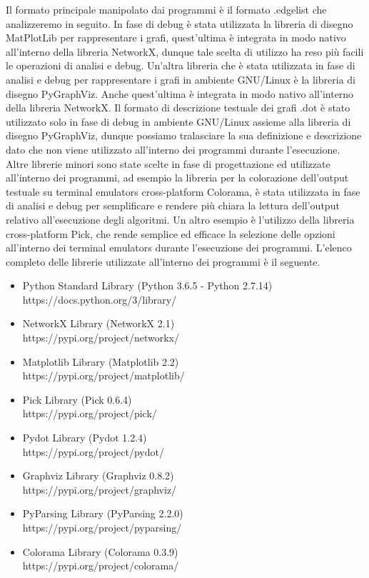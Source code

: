 Il formato principale manipolato dai programmi è il formato .edgelist che analizzeremo in seguito. In fase di debug è stata utilizzata la libreria di disegno MatPlotLib per rappresentare i grafi, quest'ultima è integrata in modo nativo all'interno della libreria NetworkX, dunque tale scelta di utilizzo ha reso più facili le operazioni di analisi e debug. Un'altra libreria che è stata utilizzata in fase di analisi e debug per rappresentare i grafi in ambiente GNU/Linux è la libreria di disegno PyGraphViz. Anche quest'ultima è integrata in modo nativo all'interno della libreria NetworkX. Il formato di descrizione testuale dei grafi .dot è stato utilizzato solo in fase di debug in ambiente GNU/Linux assieme alla libreria di disegno PyGraphViz, dunque possiamo tralasciare la sua definizione e descrizione dato che non viene utilizzato all'interno dei programmi durante l'esecuzione. Altre librerie minori sono state scelte in fase di progettazione ed utilizzate all'interno dei programmi, ad esempio la libreria per la colorazione dell'output testuale su terminal emulators cross-platform Colorama, è stata utilizzata in fase di analisi e debug per semplificare e rendere più chiara la lettura dell'output relativo all'esecuzione degli algoritmi. Un altro esempio è l'utilizzo della libreria cross-platform Pick, che rende semplice ed efficace la selezione delle opzioni all'interno dei terminal emulators durante l'esecuzione dei programmi. L'elenco completo delle librerie utilizzate all'interno dei programmi è il seguente.

\begin{itemize}
	\item Python Standard Library (Python 3.6.5 - Python 2.7.14)\\
	https://docs.python.org/3/library/
	\item NetworkX Library (NetworkX 2.1)\\ 	
	https://pypi.org/project/networkx/	
	\item Matplotlib Library (Matplotlib 2.2)\\
	https://pypi.org/project/matplotlib/
	\item Pick Library (Pick 0.6.4)\\
	https://pypi.org/project/pick/
	\item Pydot Library (Pydot 1.2.4)\\
	https://pypi.org/project/pydot/
	\item Graphviz Library (Graphviz 0.8.2)\\
	https://pypi.org/project/graphviz/
	\item PyParsing Library (PyParsing 2.2.0)\\
	https://pypi.org/project/pyparsing/
	\item Colorama Library (Colorama 0.3.9)\\
	https://pypi.org/project/colorama/
\end{itemize}


